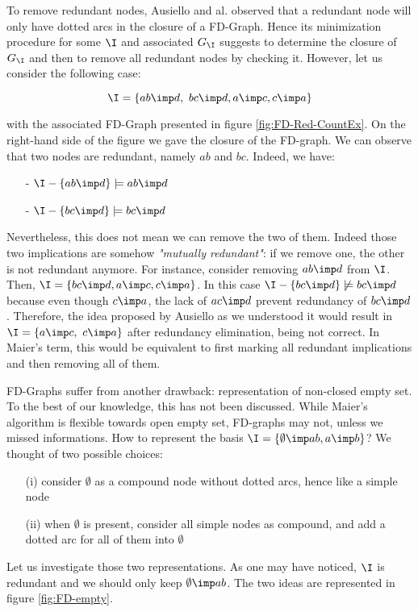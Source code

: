 To remove redundant nodes, Ausiello and al. observed that a redundant node will
only have dotted arcs in the closure of a FD-Graph. Hence its minimization procedure for some $\I$ and associated $G_{\I}$ suggests to determine the closure of $G_{\I}$ and then to remove all redundant nodes by checking it. However, let us consider the following case:

\[ \I = \{ ab \imp d, \ bc \imp d, a \imp c, c \imp a \} \]

with the associated FD-Graph presented in figure \ref{fig:FD-Red-CountEx}. On the right-hand side of the figure we gave the closure of the FD-graph. We can
observe that two nodes are redundant, namely $ab$ and $bc$. Indeed, we have:
\begin{itemize}
	\item[-] $\I - \{ab \imp d \} \models ab \imp d$
	\item[-] $\I - \{bc \imp d \} \models bc \imp d$
\end{itemize}
\noindent Nevertheless, this does not mean we can remove the two of them. Indeed
those two implications are somehow \textit{"mutually redundant"}: if we remove
one, the other is not redundant anymore. For instance, consider removing $ab \imp d$ from $\I$. Then, $\I = \{ bc \imp d, a \imp c, c \imp a \}$. In this
case $\I - \{bc \imp d \} \not\models bc \imp d$ because even though $c \imp a$,
the lack of $ac \imp d$ prevent redundancy of $bc \imp d$. Therefore, the idea
proposed by Ausiello as we understood it would result in $\I = \{ a \imp c, \ c \imp a \}$ after redundancy elimination, being not correct. In Maier's term, this would be equivalent to first marking all redundant implications and then
removing all of them.

\begin{figure}[ht]
	
\end{figure}

\vspace{1.2em}

FD-Graphs suffer from another drawback: representation of non-closed empty set.
To the best of our knowledge, this has not been discussed. While Maier's algorithm is flexible towards open empty set, FD-graphs may not, unless we missed informations. How to represent the basis $\I = \{ \emptyset \imp ab, a \imp b\}$? We thought of two possible choices:
\begin{itemize}
	\item[(i)] consider $\emptyset$ as a compound node without dotted arcs,
	hence like a simple node
	\item[(ii)] when $\emptyset$ is present, consider all simple nodes as 
	compound, and add a dotted arc for all of them into $\emptyset$
\end{itemize}
Let us investigate those two representations. As one may have noticed, $\I$
is redundant and we should only keep $\emptyset \imp ab$. The two ideas
are represented in figure \ref{fig:FD-empty}.

